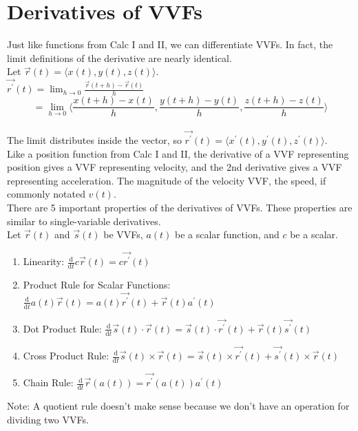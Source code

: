 \section{Derivatives of VVFs}
\noindent
Just like functions from Calc I and II, we can differentiate VVFs. In fact, the limit definitions of the derivative are nearly identical.\\
Let $\vec{r}(t) = \langle x(t), y(t), z(t) \rangle$.\\
$\vec{r^\prime}(t) = \lim_{h\to 0}{\frac{\vec{r}(t+h)-\vec{r}(t)}{h}}$\\
$$= \lim_{h\to 0}{\langle \frac{x(t+h)-x(t)}{h}, \frac{y(t+h)-y(t)}{h}, \frac{z(t+h)-z(t)}{h} \rangle}$$\\
The limit distributes inside the vector, so $\vec{r^\prime}(t) = \langle x^{\prime}(t), y^{\prime}(t), z^{\prime}(t) \rangle$.\\

\noindent
Like a position function from Calc I and II, the derivative of a VVF representing position gives a VVF representing velocity, and the 2nd derivative gives a VVF representing acceleration. The magnitude of the velocity VVF, the speed, if commonly notated $v(t)$.\\

\noindent
There are 5 important properties of the derivatives of VVFs. These properties are similar to single-variable derivatives.\\
Let $\vec{r}(t)$ and $\vec{s}(t)$ be VVFs, $a(t)$ be a scalar function, and $c$ be a scalar.\\
\begin{enumerate}
	\item Linearity: $\frac{\mathrm{d}}{\mathrm{d}t}c\vec{r}(t) = c\vec{r^\prime}(t)$
	\item Product Rule for Scalar Functions: $\frac{\mathrm{d}}{\mathrm{d}t}a(t)\vec{r}(t) = a(t)\vec{r^\prime}(t) + \vec{r}(t)a^{\prime}(t)$
	\item Dot Product Rule: $\frac{\mathrm{d}}{\mathrm{d}t}\vec{s}(t)\cdot\vec{r}(t) = \vec{s}(t)\cdot\vec{r^\prime}(t) + \vec{r}(t)\vec{s^\prime}(t)$
	\item Cross Product Rule: $\frac{\mathrm{d}}{\mathrm{d}t}\vec{s}(t)\times\vec{r}(t) = \vec{s}(t)\times\vec{r^\prime}(t) + \vec{s^\prime}(t)\times\vec{r}(t)$
	\item Chain Rule: $\frac{\mathrm{d}}{\mathrm{d}t}\vec{r}(a(t)) = \vec{r^\prime}(a(t))a^{\prime}(t)$
\end{enumerate}
\small{Note: A quotient rule doesn't make sense because we don't have an operation for dividing two VVFs.}

